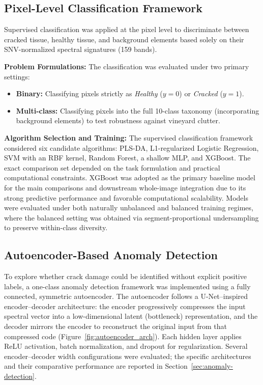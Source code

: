\subsection{Pixel-Level Classification Framework}
\label{subsec:pixel_level_framework}

\noindent
Supervised classification was applied at the pixel level to discriminate between cracked tissue, healthy tissue, and background elements based solely on their SNV-normalized spectral signatures (159 bands).

\medskip
\noindent
\textbf{Problem Formulations:} The classification was evaluated under two primary settings:
\begin{itemize}
    \item \textbf{Binary:} Classifying pixels strictly as \textit{Healthy} ($y=0$) or \textit{Cracked} ($y=1$).
    \item \textbf{Multi-class:} Classifying pixels into the full 10-class taxonomy (incorporating background elements) to test robustness against vineyard clutter.
\end{itemize}

\medskip
\noindent
\textbf{Algorithm Selection and Training:}
The supervised classification framework considered six candidate algorithms: PLS-DA, L1-regularized Logistic Regression, SVM with an RBF kernel, Random Forest, a shallow MLP, and XGBoost. The exact comparison set depended on the task formulation and practical computational constraints. XGBoost was adopted as the primary baseline model for the main comparisons and downstream whole-image integration due to its strong predictive performance and favorable computational scalability. Models were evaluated under both naturally unbalanced and balanced training regimes, where the balanced setting was obtained via segment-proportional undersampling to preserve within-class diversity.
\subsection{Autoencoder-Based Anomaly Detection}
\label{subsec:anomaly_detection}

\noindent
To explore whether crack damage could be identified without explicit positive labels, a one-class anomaly detection framework was implemented using a fully connected, symmetric autoencoder. The autoencoder follows a U-Net--inspired encoder--decoder architecture: the encoder progressively compresses the input spectral vector into a low-dimensional latent (bottleneck) representation, and the decoder mirrors the encoder to reconstruct the original input from that compressed code (Figure~\ref{fig:autoencoder_arch}). Each hidden layer applies ReLU activation, batch normalization, and dropout for regularization. Several encoder--decoder width configurations were evaluated; the specific architectures and their comparative performance are reported in Section~\ref{sec:anomaly-detection}.

